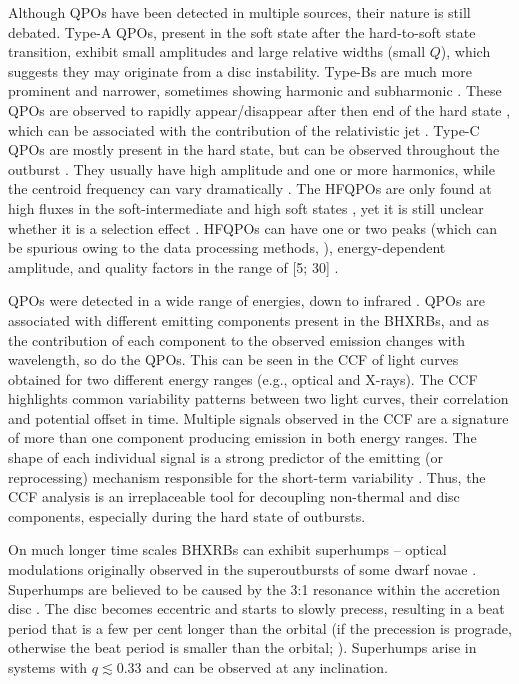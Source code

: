 Although \glspl{QPO} have been detected in multiple sources, their nature is still debated.
Type-A \glspl{QPO}, present in the soft state after the hard-to-soft state transition, exhibit small amplitudes and large relative widths (small $Q$), which suggests they may originate from a disc instability.
Type-Bs are much more prominent and narrower, sometimes showing harmonic and subharmonic \citep{Casella2004}.
These \glspl{QPO} are observed to rapidly appear/disappear after then end of the hard state \citep{Motta2016}, which can be associated with the contribution of the relativistic jet \citep{Fender2009, Homan2020}.
Type-C \glspl{QPO} are mostly present in the hard state, but can be observed throughout the outburst \citep{Motta2016}.
They usually have high amplitude and one or more harmonics, while the centroid frequency can vary dramatically \citep{Motta2015}.
The \glspl{HFQPO} are only found at high fluxes in the soft-intermediate and high soft states \citep{Belloni2012}, yet it is still unclear whether it is a selection effect \citep{Motta2016, Ingram2019}.
\Glspl{HFQPO} can have one or two peaks (which can be spurious owing to the data processing methods, \citealt{Motta2016}), energy-dependent amplitude, and quality factors in the range of [5; 30] \citep{Ingram2019}.


\glspl{QPO} were detected in a wide range of energies, down to infrared \citep{Kalamkar2016}.
\glspl{QPO} are associated with different emitting components present in the \glspl{BHXRB}, and as the contribution of each component to the observed emission changes with wavelength, so do the \glspl{QPO}.
This can be seen in the \gls{CCF} of light curves obtained for two different energy ranges (e.g., optical and X-rays).
The \gls{CCF} highlights common variability patterns between two light curves, their correlation and potential offset in time.
Multiple signals observed in the \gls{CCF} are a signature of more than one component producing emission in both energy ranges.
The shape of each individual signal is a strong predictor of the emitting (or reprocessing) mechanism responsible for the short-term variability \citep[see, e.g, ][]{Malzac2004,Gandhi2008,Veledina2015,Omama2021}.
Thus, the \gls{CCF} analysis is an irreplaceable tool for decoupling non-thermal and disc components, especially during the hard state of outbursts.



On much longer time scales \glspl{BHXRB} can exhibit superhumps -- optical modulations originally observed in the superoutbursts of some dwarf novae \citep{Vogt1974,Warner1975,Osaki1996}.
Superhumps are believed to be caused by the 3:1 resonance within the accretion disc \citep{Whitehurst1991}.
The disc becomes eccentric and starts to slowly precess, resulting in a beat period that is a few per cent longer than the orbital (if the precession is prograde, otherwise the beat period is smaller than the orbital; \citealt{Donoghue1996, Zurita2002}).
Superhumps arise in systems with $q \lesssim 0.33$ and can be observed at any inclination.

